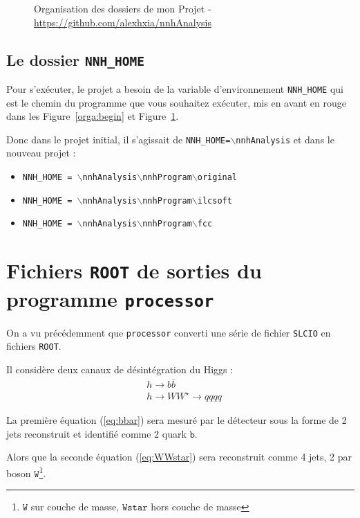 \documentclass[10pt,a4paper]{report}
\newcommand{\ROOT}{\texttt{ROOT}\xspace}
\newcommand{\SLCIO}{\texttt{SLCIO}\xspace}
\newcommand{\processor}{\texttt{processor}\xspace}
\newcommand{\particle}[1]{$\texttt{#1}$}
\newcommand{\bbar}{\overline{b}}
\newcommand{\Wstar}{W^{\star}}
\begin{document}
\begin{appendix}
\begin{figure}[h!]
	\caption{
		Organisation des dossiers de mon Projet - \url{https://github.com/alexhxia/nnhAnalysis}
	}
	\label{orga:end}
\end{figure}

\section{Le dossier \texttt{NNH\_HOME}}

Pour s'exécuter, le projet a besoin de la variable d'environnement \texttt{NNH\_HOME} qui est le chemin du programme que vous souhaitez exécuter,  mis en avant en rouge dans les Figure~\ref{orga:begin} et Figure~\ref{orga:end}.

Donc dans le projet initial, il s'agissait de \texttt{NNH\_HOME=$\backslash$nnhAnalysis} et dans le nouveau projet :
\begin{itemize}
	\item \texttt{NNH\_HOME = $\backslash$nnhAnalysis$\backslash$nnhProgram$\backslash$original}
	\item \texttt{NNH\_HOME = $\backslash$nnhAnalysis$\backslash$nnhProgram$\backslash$ilcsoft}
	\item \texttt{NNH\_HOME = $\backslash$nnhAnalysis$\backslash$nnhProgram$\backslash$fcc}
\end{itemize}


\chapter{Fichiers \ROOT de sorties du programme \processor}

On a vu précédemment que \processor converti une série de fichier \SLCIO en fichiers \ROOT. 

Il considère deux canaux de désintégration du Higgs :
\begin{align}
	& h \longrightarrow b \bbar \label{eq:bbar}\\
	& h \longrightarrow W \Wstar \longrightarrow qqqq \label{eq:WWstar}
\end{align}

La première équation (\ref{eq:bbar}) sera mesuré par le détecteur sous la forme de 2 jets reconstruit et identifié comme 2 quark \particle{b}.

Alors que la seconde équation (\ref{eq:WWstar}) sera reconstruit comme 4 jets, 2 par boson \particle{W}\footnote{\particle{W} sur couche de masse, \particle{Wstar} hors couche de masse}.

\end{appendix}
\end{document}
